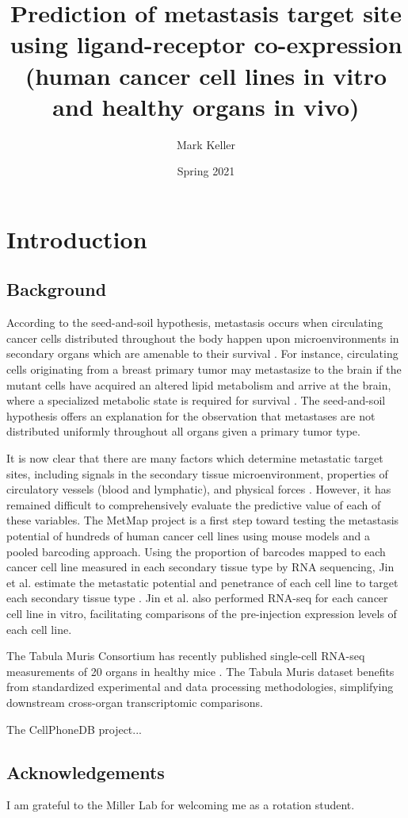 \documentclass[12pt, letterpaper]{article}
\title{Prediction of metastasis target site using ligand-receptor co-expression (human cancer cell lines in vitro and healthy organs in vivo)}
\author{Mark Keller}
\date{Spring 2021}
\begin{document}
\maketitle

\section{Introduction}
\subsection{Background}
According to the seed-and-soil hypothesis, metastasis occurs when circulating cancer cells distributed throughout the body happen upon microenvironments in secondary organs which are amenable to their survival \cite{paget_distribution_1889}.
For instance, circulating cells originating from a breast primary tumor may metastasize to the brain if the mutant cells have acquired an altered lipid metabolism and arrive at the brain, where a specialized metabolic state is required for survival \cite{jin_metastasis_2020}.
The seed-and-soil hypothesis offers an explanation for the observation that metastases are not distributed uniformly throughout all organs given a primary tumor type.


It is now clear that there are many factors which determine metastatic target sites, including signals in the secondary tissue microenvironment, properties of circulatory vessels (blood and lymphatic), and physical forces \cite{gupta_cancer_2006}.
However, it has remained difficult to comprehensively evaluate the predictive value of each of these variables.
The MetMap project is a first step toward testing the metastasis potential of hundreds of human cancer cell lines using mouse models and a pooled barcoding approach.
Using the proportion of barcodes mapped to each cancer cell line measured in each secondary tissue type by RNA sequencing, Jin et al. estimate the metastatic potential and penetrance of each cell line to target each secondary tissue type \cite{jin_metastasis_2020}.
Jin et al. also performed RNA-seq for each cancer cell line in vitro, facilitating comparisons of the pre-injection expression levels of each cell line.


The Tabula Muris Consortium has recently published single-cell RNA-seq measurements of 20 organs in healthy mice \cite{schaum_single-cell_2018}.
The Tabula Muris dataset benefits from standardized experimental and data processing methodologies, simplifying downstream cross-organ transcriptomic comparisons.


The CellPhoneDB project...

\subsection*{Acknowledgements}
I am grateful to the Miller Lab for welcoming me as a rotation student.


{}

\end{document}
